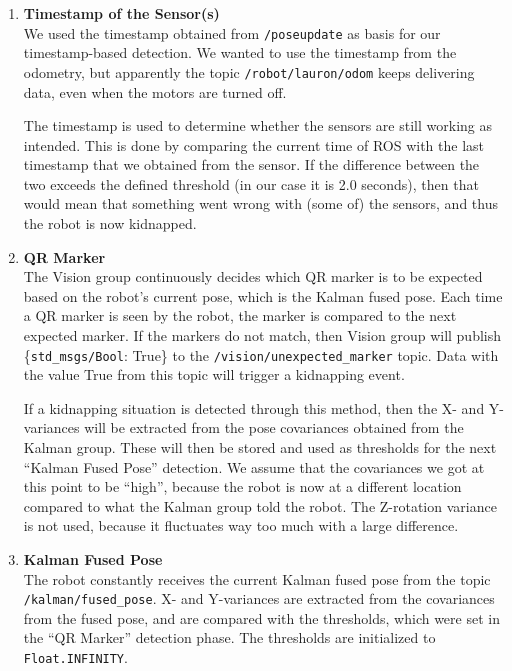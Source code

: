 \begin{enumerate}

\item \textbf{Timestamp of the Sensor(s)} \hfill \\
We used the timestamp obtained from \texttt{/poseupdate} as basis for our timestamp-based detection. We wanted to use the timestamp from the odometry, but apparently the topic \texttt{/robot/lauron/odom} keeps delivering data, even when the motors are turned off.

The timestamp is used to determine whether the sensors are still working as intended. This is done by comparing the current time of ROS with the last timestamp that we obtained from the sensor. If the difference between the two exceeds the defined threshold (in our case it is 2.0 seconds), then that would mean that something went wrong with (some of) the sensors, and thus the robot is now kidnapped.

\item \textbf{QR Marker} \hfill \\
The Vision group continuously decides which QR marker is to be expected based on the robot's current pose, which is the Kalman fused pose. Each time a QR marker is seen by the robot, the marker is compared to the next expected marker. If the markers do not match, then Vision group will publish \{\texttt{std\_msgs/Bool}: True\} to the  \texttt{/vision/unexpected\_marker} topic. Data with the value True from this topic will trigger a kidnapping event.

If a kidnapping situation is detected through this method, then the X- and Y-variances will be extracted from the pose covariances obtained from the Kalman group. These will then be stored and used as thresholds for the next ``Kalman Fused Pose'' detection. We assume that the covariances we got at this point to be ``high'', because the robot is now at a different location compared to what the Kalman group told the robot. The Z-rotation variance is not used, because it fluctuates way too much with a large difference.

\item \textbf{Kalman Fused Pose} \hfill \\
The robot constantly receives the current Kalman fused pose from the topic \texttt{/kalman/fused\_pose}. X- and Y-variances are extracted from the covariances from the fused pose, and are compared with the thresholds, which were set in the ``QR Marker'' detection phase. The thresholds are initialized to \texttt{Float.INFINITY}.

\end{enumerate}

